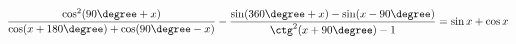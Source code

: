\begin{ex}[type=prove_identity]
	\begin{condition}
		\( \dfrac{\cos^2(90\degree+x)}{\cos(x+180\degree)+\cos(90\degree-x)}-\dfrac{\sin(360\degree+x)-\sin(x-90\degree)}{\ctg^2(x+90\degree)-1}=\sin x+\cos x \)
	\end{condition}
\end{ex}